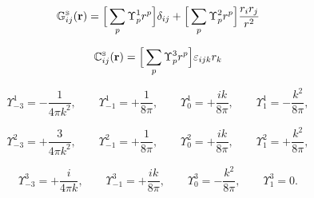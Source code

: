 \documentclass[letterpaper]{article}
\begin{document}
$$ \mathbb{G}^{\hbox{\tiny{S}}}_{ij}(\mathbf{r})
   = \Big[ \sum_p \Upsilon_p^1 r^p \Big] \delta_{ij} 
    +\Big[ \sum_p \Upsilon_p^2 r^p \Big] \frac{r_i r_j}{r^2}
$$

$$ \mathbb{C}^{\hbox{\tiny{S}}}_{ij}(\mathbf{r})
   = \Big[ \sum_p \Upsilon_p^3 r^p \Big] \varepsilon_{ijk} r_k
$$

$$
 \Upsilon_{-3}^{1} = -\frac{1}{4\pi k^2},      \qquad 
 \Upsilon_{-1}^{1} = +\frac{1}{8\pi},          \qquad 
 \Upsilon_{ 0}^{1} = +\frac{ik}{8\pi},         \qquad 
 \Upsilon_{ 1}^{1} = -\frac{k^2}{8\pi},
$$

$$
 \Upsilon_{-3}^{2} = +\frac{3}{4 \pi k^2},      \qquad 
 \Upsilon_{-1}^{2} = +\frac{1}{8\pi},          \qquad 
 \Upsilon_{ 0}^{2} = +\frac{ik}{8\pi},         \qquad 
 \Upsilon_{ 1}^{2} = +\frac{k^2}{8\pi},
$$

$$
 \Upsilon_{-3}^{3} = +\frac{i}{4\pi k},  \qquad
 \Upsilon_{-1}^{3} = +\frac{ik}{8\pi},   \qquad
 \Upsilon_{ 0}^{3} = -\frac{k^2}{8\pi},  \qquad 
 \Upsilon_{ 1}^{3} = 0.
$$
\end{document}
